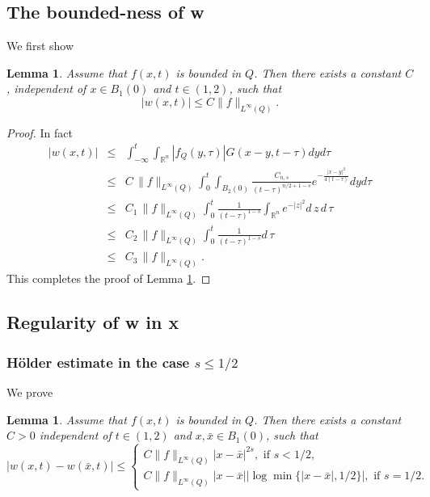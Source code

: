 \documentclass[12pt]{article}
\newtheorem{lemma}[definition]{Lemma}
\theoremstyle{remark}
\numberwithin{equation}{section}
\begin{document}
\subsection{The bounded-ness of w}

We first show
\begin{lemma} \label{lem4.1}
Assume that $f(x,t)$ is bounded in $Q$. Then  there exists a constant $C$, independent of $x \in B_1(0)$ and $t \in (1,2)$, such that
\begin{equation}
|w(x,t)| \leq C \|f\|_{L^\infty (Q)}.
\label{Ewx0}
\end{equation}
\end{lemma}

\begin{proof} In fact
\begin{eqnarray*}
|w(x,t)| &\leq &  \int_{-\infty}^t \int_{\mathbb{R}^n} | f_Q(y,\tau)| G(x-y, t-\tau) d y d\tau \nonumber \\
& \leq & C \, \|f\|_{L^\infty (Q)} \int_{0}^t \int_{B_2(0)} \frac{C_{n,s}}{(t-\tau)^{n/2+1-s}} e^{-\frac{|x-y|^2}{4(t-\tau)}} d y d \tau \nonumber \\
& \leq & C_1 \, \|f\|_{L^\infty (Q)} \int_{0}^t \frac{1}{(t-\tau)^{1-s}} \int_{\mathbb{R}^n} e^{-|z|^2} d \, z \, d \, \tau \nonumber \\
& \leq & C_2 \, \|f\|_{L^\infty (Q)} \int_{0}^t \frac{1}{(t-\tau)^{1-s}} d \, \tau \nonumber \\
& \leq & C_3 \, \|f\|_{L^\infty (Q)}.
\end{eqnarray*}
This completes the proof of Lemma \ref{lem4.1}. \end{proof}


\subsection{Regularity of w in x}



\subsubsection{H\"{o}lder estimate in the case $s \leq 1/2$}

We prove
\begin{lemma} \label{lem4.2}
Assume that $f(x,t)$ is bounded in $Q$.
Then there exists a constant $C>0$ independent of $t \in (1,2)$ and $x, \bar{x} \in B_1(0)$, such that
\begin{equation}
|w(x,t) - w(\bar{x}, t) | \leq \left\{\begin{array}{ll} C \|f\|_{L^\infty (Q)} |x-\bar{x}|^{2s}, \mbox{ if } s < 1/2,\\
C \|f\|_{L^\infty (Q)} |x-\bar{x}|  |\log \min\{|x-\bar{x}|, 1/2\}|, \mbox{ if } s = 1/2.
\end{array}
\right.
\label{Ewx1}
\end{equation}
\end{lemma}
\end{document}
